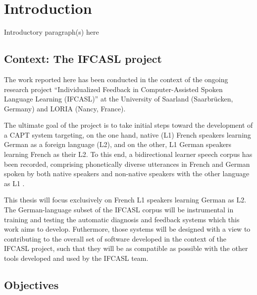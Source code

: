 %
%
\chapter{Introduction}
\label{chap:intro}


Introductory paragraph(s) here

\section{Context: The IFCASL project}
\label{sec:intro:ifcasl}

The work reported here has been conducted in the context of the ongoing research project ``Individualized Feedback in Computer-Assisted Spoken Language Learning (IFCASL)'' at the University of Saarland (Saarbrücken, Germany) and LORIA (Nancy, France). 

The ultimate goal of the project is to take initial steps toward the development of a CAPT system targeting, on the one hand, native (L1) French speakers learning German as a foreign language (L2), and on the other, L1 German speakers learning French as their L2. To this end, a bidirectional learner speech corpus has been recorded, comprising phonetically diverse utterances in French and German spoken by both native speakers and non-native speakers with the other language as L1 \citep{Fauth2014,Trouvain2013}.  

This thesis will focus exclusively on French L1 speakers learning German as L2. The German-language subset of the IFCASL corpus will be instrumental in training and testing the automatic diagnosis and feedback systems which this work aims to develop. Futhermore, those systems will be designed with a view to contributing to the overall set of software developed in the context of the IFCASL project, such that they will be as compatible as possible with the other tools developed and used by the IFCASL team. %


\section{Objectives}
\label{sec:intro:objectives}

